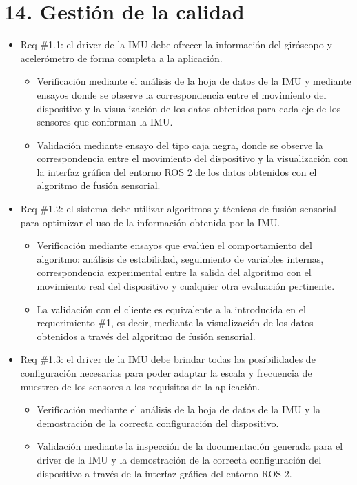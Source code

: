 \documentclass[
11pt, %
codirector, %
]{charter}
\begin{document}
\section{14. Gestión de la calidad}
\label{sec:calidad}

\begin{itemize}
	\item Req \#1.1: el driver de la IMU debe ofrecer la información del giróscopo y acelerómetro de forma completa a la aplicación.
	\begin{itemize}
		\item Verificación mediante el análisis de la hoja de datos de la IMU y mediante ensayos donde se observe la correspondencia entre el movimiento del dispositivo y la visualización de los datos obtenidos para cada eje de los sensores que conforman la IMU.
		\item Validación mediante ensayo del tipo caja negra, donde se observe la correspondencia entre el movimiento del dispositivo y la visualización con la interfaz gráfica del entorno ROS 2 de los datos obtenidos con el algoritmo de fusión sensorial.
	\end{itemize}
	\item Req \#1.2: el sistema debe utilizar algoritmos y técnicas de fusión sensorial para optimizar el uso de la información obtenida por la IMU.
	\begin{itemize}
		\item Verificación mediante ensayos que evalúen el comportamiento del algoritmo: análisis de estabilidad, seguimiento de variables internas, correspondencia experimental entre la salida del algoritmo con el movimiento real del dispositivo y cualquier otra evaluación pertinente.
		\item La validación con el cliente es equivalente a la introducida en el requerimiento \#1, es decir, mediante la visualización de los datos obtenidos a través del algoritmo de fusión sensorial.
	\end{itemize}
	\item Req \#1.3: el driver de la IMU debe brindar todas las posibilidades de configuración necesarias para poder adaptar la escala y frecuencia de muestreo de los sensores a los requisitos de la aplicación.
	\begin{itemize}
		\item Verificación mediante el análisis de la hoja de datos de la IMU y la demostración de la correcta configuración del dispositivo.
		\item Validación mediante la inspección de la documentación generada para el driver de la IMU y la demostración de la correcta configuración del dispositivo a través de la interfaz gráfica del entorno ROS 2.

\end{itemize}
\end{itemize}
\end{document}
